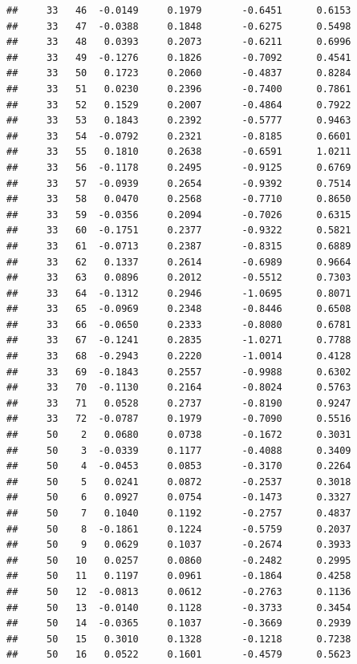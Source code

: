 \documentclass[
]{article}
\begin{document}
\begin{verbatim}
##     33   46  -0.0149     0.1979       -0.6451      0.6153  
##     33   47  -0.0388     0.1848       -0.6275      0.5498  
##     33   48   0.0393     0.2073       -0.6211      0.6996  
##     33   49  -0.1276     0.1826       -0.7092      0.4541  
##     33   50   0.1723     0.2060       -0.4837      0.8284  
##     33   51   0.0230     0.2396       -0.7400      0.7861  
##     33   52   0.1529     0.2007       -0.4864      0.7922  
##     33   53   0.1843     0.2392       -0.5777      0.9463  
##     33   54  -0.0792     0.2321       -0.8185      0.6601  
##     33   55   0.1810     0.2638       -0.6591      1.0211  
##     33   56  -0.1178     0.2495       -0.9125      0.6769  
##     33   57  -0.0939     0.2654       -0.9392      0.7514  
##     33   58   0.0470     0.2568       -0.7710      0.8650  
##     33   59  -0.0356     0.2094       -0.7026      0.6315  
##     33   60  -0.1751     0.2377       -0.9322      0.5821  
##     33   61  -0.0713     0.2387       -0.8315      0.6889  
##     33   62   0.1337     0.2614       -0.6989      0.9664  
##     33   63   0.0896     0.2012       -0.5512      0.7303  
##     33   64  -0.1312     0.2946       -1.0695      0.8071  
##     33   65  -0.0969     0.2348       -0.8446      0.6508  
##     33   66  -0.0650     0.2333       -0.8080      0.6781  
##     33   67  -0.1241     0.2835       -1.0271      0.7788  
##     33   68  -0.2943     0.2220       -1.0014      0.4128  
##     33   69  -0.1843     0.2557       -0.9988      0.6302  
##     33   70  -0.1130     0.2164       -0.8024      0.5763  
##     33   71   0.0528     0.2737       -0.8190      0.9247  
##     33   72  -0.0787     0.1979       -0.7090      0.5516  
##     50    2   0.0680     0.0738       -0.1672      0.3031  
##     50    3  -0.0339     0.1177       -0.4088      0.3409  
##     50    4  -0.0453     0.0853       -0.3170      0.2264  
##     50    5   0.0241     0.0872       -0.2537      0.3018  
##     50    6   0.0927     0.0754       -0.1473      0.3327  
##     50    7   0.1040     0.1192       -0.2757      0.4837  
##     50    8  -0.1861     0.1224       -0.5759      0.2037  
##     50    9   0.0629     0.1037       -0.2674      0.3933  
##     50   10   0.0257     0.0860       -0.2482      0.2995  
##     50   11   0.1197     0.0961       -0.1864      0.4258  
##     50   12  -0.0813     0.0612       -0.2763      0.1136  
##     50   13  -0.0140     0.1128       -0.3733      0.3454  
##     50   14  -0.0365     0.1037       -0.3669      0.2939  
##     50   15   0.3010     0.1328       -0.1218      0.7238  
##     50   16   0.0522     0.1601       -0.4579      0.5623  

\end{verbatim}
\end{document}
